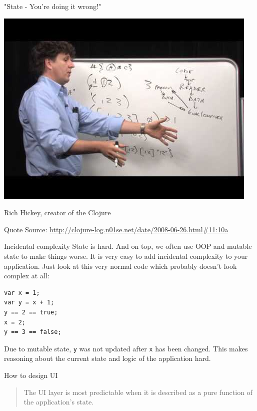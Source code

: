 \documentclass[bigger]{beamer}
\begin{document}
\begin{frame}[label=sec-2-2]{"State - You're doing it wrong!"}
\begin{center}


\includegraphics[height=0.6\textheight]{images/rich-hickey.jpg}
\end{center}

Rich Hickey, creator of the Clojure 

Quote Source: \url{http://clojure-log.n01se.net/date/2008-06-26.html#11:10a}
\end{frame}

\begin{frame}[fragile,label=sec-2-3]{Incidental complexity}
 State is hard. And on top, we often use \alert{OOP} and \alert{mutable state} to
make things worse. It is very easy to add incidental complexity to
your application. Just look at this very normal code which probably
doesn't look complex at all:

\begin{verbatim}
var x = 1;
var y = x + 1;
y == 2 == true;
x = 2;
y == 3 == false;
\end{verbatim}

Due to \alert{mutable state}, \texttt{y} was not updated after \texttt{x} has been changed.
This makes reasoning about the current state and logic of the
application hard.
\end{frame}

\begin{frame}[label=sec-2-4]{How to design UI}
\begin{quote}


The UI layer is most predictable when it is described as a pure
function of the application's state.
\end{quote}
\end{frame}
\end{document}
